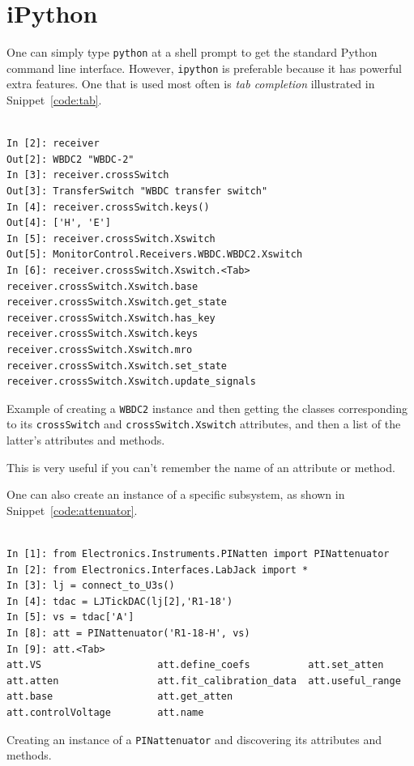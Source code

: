 \documentclass[letterpaper,11pt]{book}
\begin{document}
\section{iPython}

One can simply type {\tt python} at a shell prompt to get the standard Python
command line interface.  However, {\tt ipython} is preferable because it has
powerful extra features.  One that is used most often is {\it tab completion}
illustrated in Snippet~\ref{code:tab}.
\begin{code}[h!tb]
\begin{center}
\begin{verbatim}

In [2]: receiver
Out[2]: WBDC2 "WBDC-2"
In [3]: receiver.crossSwitch
Out[3]: TransferSwitch "WBDC transfer switch"
In [4]: receiver.crossSwitch.keys()
Out[4]: ['H', 'E']
In [5]: receiver.crossSwitch.Xswitch
Out[5]: MonitorControl.Receivers.WBDC.WBDC2.Xswitch
In [6]: receiver.crossSwitch.Xswitch.<Tab>
receiver.crossSwitch.Xswitch.base
receiver.crossSwitch.Xswitch.get_state
receiver.crossSwitch.Xswitch.has_key
receiver.crossSwitch.Xswitch.keys
receiver.crossSwitch.Xswitch.mro
receiver.crossSwitch.Xswitch.set_state
receiver.crossSwitch.Xswitch.update_signals\end{verbatim}
\caption[Creating a {\tt WBDC2} instance]{\label{code:tab}Example of creating a
{\tt WBDC2} instance and then
getting the classes corresponding to its {\tt crossSwitch} and
{\tt crossSwitch.Xswitch} attributes, and then a list of the latter's 
attributes and methods.}
\end{center}
\end{code}
This is very useful if you can't remember the name of an attribute or method.

One can also create an instance of a specific subsystem, as shown in
Snippet~\ref{code:attenuator}.
\begin{code}[h!tb]
\begin{center}
\begin{verbatim}

In [1]: from Electronics.Instruments.PINatten import PINattenuator
In [2]: from Electronics.Interfaces.LabJack import *
In [3]: lj = connect_to_U3s()
In [4]: tdac = LJTickDAC(lj[2],'R1-18')
In [5]: vs = tdac['A']
In [8]: att = PINattenuator('R1-18-H', vs)
In [9]: att.<Tab>
att.VS                    att.define_coefs          att.set_atten
att.atten                 att.fit_calibration_data  att.useful_range
att.base                  att.get_atten             
att.controlVoltage        att.name    \end{verbatim}
\caption[Creating a {\tt PINattenuator} instance]{\label{code:attenuator}
Creating an instance of a
{\tt PINattenuator} and discovering its attributes and methods.}
\end{center}
\end{code}
\end{document}
